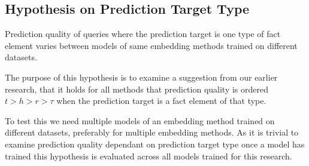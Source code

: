 \subsection{Hypothesis on Prediction Target Type}
\label{sec:hypothesis_prediction_target_type}

\begin{hypothesis}
\label{hyp:prediction_target_type}
Prediction quality of queries where the prediction target is one type of fact element varies between models of same embedding methods trained on different datasets.
\end{hypothesis}

The purpose of this hypothesis is to examine a suggestion from our earlier research, that it holds for all methods that prediction quality is ordered $t>h>r>\tau$ when the prediction target is a fact element of that type.

To test this we need multiple models of an embedding method trained on different datasets, preferably for multiple embedding methods.
As it is trivial to examine prediction quality dependant on prediction target type once a model has trained this hypothesis is evaluated across all models trained for this research.